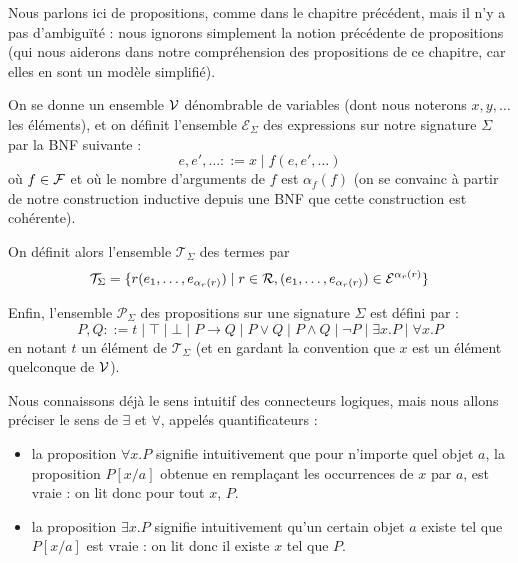 \vspace{1cm}

\begin{rmk}
    Nous parlons ici de propositions, comme dans le chapitre précédent, mais il n'y a pas d'ambiguïté : nous ignorons simplement la notion précédente de propositions (qui nous aiderons dans notre compréhension des propositions de ce chapitre, car elles en sont un modèle simplifié).
\end{rmk}

\begin{defi}
    On se donne un ensemble $\mathcal V$ dénombrable de variables (dont nous noterons $x,y,\ldots$ les éléments), et on définit l'ensemble $\mathcal E_\Sigma$ des expressions sur notre signature $\Sigma$ par la BNF suivante : $$e,e',\ldots ::= x \mid f(e,e',\ldots)$$ où $f\in \mathcal F$ et où le nombre d'arguments de $f$ est $\alpha_f(f)$ (on se convainc à partir de notre construction inductive depuis une BNF que cette construction est cohérente). 
    
    On définit alors l'ensemble $\mathcal T_\Sigma$ des termes par $$\mathcal T_\Sigma = \{ r(e_1,\ldots,e_{\alpha_r(r)})\mid r\in \mathcal R, (e_1,\ldots,e_{\alpha_r(r)})\in\mathcal E^{\alpha_r(r)}\}$$

    Enfin, l'ensemble $\mathcal P_\Sigma$ des propositions sur une signature $\Sigma$ est défini par : $$P,Q ::= t\mid \top\mid\bot \mid P\to Q \mid P\lor Q \mid P \land Q \mid \lnot P\mid\exists x.P\mid\forall x.P$$ en notant $t$ un élément de $\mathcal T_\Sigma$ (et en gardant la convention que $x$ est un élément quelconque de $\mathcal V$).
\end{defi}

Nous connaissons déjà le sens intuitif des connecteurs logiques, mais nous allons préciser le sens de $\exists$ et $\forall$, appelés quantificateurs :
\begin{itemize}[label=$\bullet$]
    \item la proposition $\forall x.P$ signifie intuitivement que pour n'importe quel objet $a$, la proposition $P[x/a]$ obtenue en remplaçant les occurrences de $x$ par $a$, est vraie : on lit donc \og pour tout $x$, $P$\fg{}.
    \item la proposition $\exists x.P$ signifie intuitivement qu'un certain objet $a$ existe tel que $P[x/a]$ est vraie : on lit donc \og il existe $x$ tel que $P$\fg{}.
\end{itemize}

